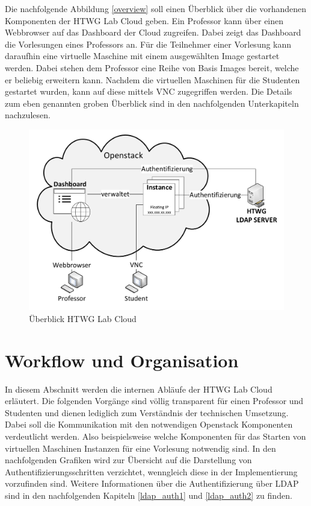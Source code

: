 Die nachfolgende Abbildung \autoref{overview} soll einen Überblick über 
die vorhandenen Komponenten der HTWG Lab Cloud geben. Ein Professor kann über einen
Webbrowser auf das Dashboard der Cloud zugreifen. Dabei zeigt das Dashboard die Vorlesungen
eines Professors an. Für die Teilnehmer einer Vorlesung kann daraufhin eine virtuelle Maschine
mit einem ausgewählten Image gestartet werden. Dabei stehen dem Professor eine Reihe von Basis
Images bereit, welche er beliebig erweitern kann.
Nachdem die virtuellen Maschinen für die Studenten gestartet wurden, kann auf diese mittels
VNC zugegriffen werden.
Die Details zum eben genannten groben Überblick sind in den nachfolgenden 
Unterkapiteln nachzulesen.

\begin{figure}[H]
	\centering
	\includegraphics[scale=0.4]{img/overview.pdf}
\caption{Überblick HTWG Lab Cloud}
\label{overview}
\FloatBarrier
\end{figure}

\section{Workflow und Organisation}
In diesem Abschnitt werden die internen Abläufe der HTWG Lab Cloud erläutert. Die folgenden
Vorgänge sind völlig transparent für einen Professor und Studenten und dienen lediglich zum
Verständnis der technischen Umsetzung.
Dabei soll die Kommunikation mit den notwendigen Openstack Komponenten verdeutlicht werden.
Also beispielsweise welche Komponenten für das Starten von virtuellen Maschinen Instanzen 
für eine Vorlesung notwendig sind.
In den nachfolgenden Grafiken wird zur Übersicht auf die Darstellung von
Authentifizierungsschritten verzichtet, wenngleich diese in der Implementierung vorzufinden sind.
Weitere Informationen über die Authentifizierung über LDAP sind in den nachfolgenden
Kapiteln \ref{ldap_auth1} und \ref{ldap_auth2} zu finden.

